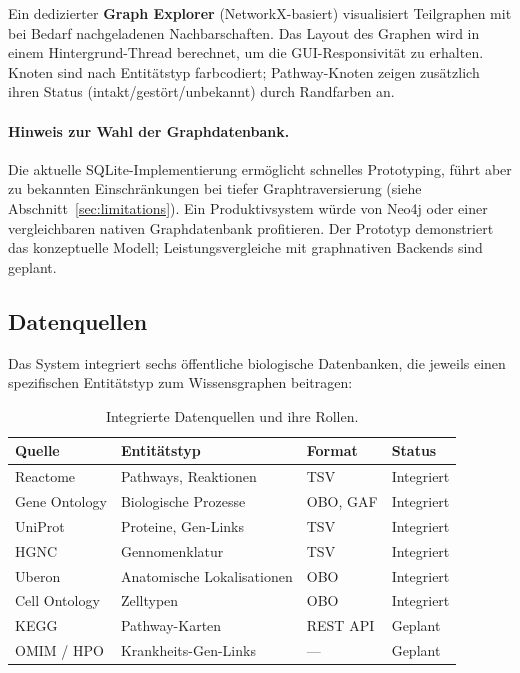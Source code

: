 \documentclass[12pt,a4paper]{article}
\begin{document}
Ein dedizierter \textbf{Graph Explorer} (NetworkX-basiert) visualisiert Teilgraphen mit bei Bedarf nachgeladenen Nachbarschaften. Das Layout des Graphen wird in einem Hintergrund-Thread berechnet, um die GUI-Responsivität zu erhalten. Knoten sind nach Entitätstyp farbcodiert; Pathway-Knoten zeigen zusätzlich ihren Status (intakt/gestört/unbekannt) durch Randfarben an.

\paragraph{Hinweis zur Wahl der Graphdatenbank.} Die aktuelle SQLite-Implementierung ermöglicht schnelles Prototyping, führt aber zu bekannten Einschränkungen bei tiefer Graphtraversierung (siehe Abschnitt~\ref{sec:limitations}). Ein Produktivsystem würde von Neo4j oder einer vergleichbaren nativen Graphdatenbank profitieren. Der Prototyp demonstriert das konzeptuelle Modell; Leistungsvergleiche mit graphnativen Backends sind geplant.

\subsection{Datenquellen}
\label{sec:datasources}

Das System integriert sechs öffentliche biologische Datenbanken, die jeweils einen spezifischen Entitätstyp zum Wissensgraphen beitragen:

\begin{table}[H]
\centering
\caption{Integrierte Datenquellen und ihre Rollen.}
\label{tab:datasources}
\small
\begin{tabularx}{\textwidth}{@{}YYll@{}}
\toprule
\textbf{Quelle} & \textbf{Entitätstyp} & \textbf{Format} & \textbf{Status} \\
\midrule
Reactome \citep{Fabregat2018} & Pathways, Reaktionen & TSV & Integriert \\
Gene Ontology \citep{Ashburner2000} & Biologische Prozesse & OBO, GAF & Integriert \\
UniProt \citep{UniProt2023} & Proteine, Gen-Links & TSV & Integriert \\
HGNC \citep{Braschi2019} & Gennomenklatur & TSV & Integriert \\
Uberon \citep{Mungall2012} & Anatomische Lokalisationen & OBO & Integriert \\
Cell Ontology \citep{Diehl2016} & Zelltypen & OBO & Integriert \\
KEGG \citep{Kanehisa2023} & Pathway-Karten & REST API & Geplant \\
OMIM \citep{Amberger2019} / HPO \citep{Robinson2008} & Krankheits-Gen-Links & --- & Geplant \\
\bottomrule
\end{tabularx}
\end{table}
\end{document}
